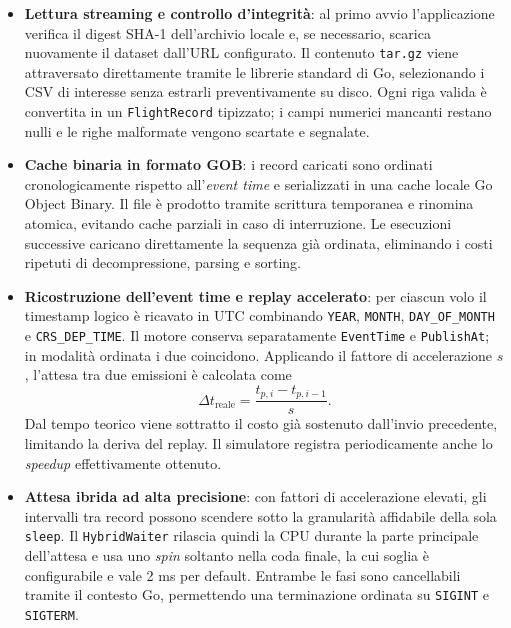 \documentclass[conference]{IEEEtran}
\begin{document}
\begin{itemize}
    \item \textbf{Lettura streaming e controllo d'integrità}: al primo avvio l'applicazione verifica il digest SHA-1 dell'archivio locale e, se necessario, scarica nuovamente il dataset dall'URL configurato. Il contenuto \texttt{tar.gz} viene attraversato direttamente tramite le librerie standard di Go, selezionando i CSV di interesse senza estrarli preventivamente su disco. Ogni riga valida è convertita in un \texttt{FlightRecord} tipizzato; i campi numerici mancanti restano nulli e le righe malformate vengono scartate e segnalate.

    \item \textbf{Cache binaria in formato GOB}: i record caricati sono ordinati cronologicamente rispetto all'\emph{event time} e serializzati in una cache locale Go Object Binary. Il file è prodotto tramite scrittura temporanea e rinomina atomica, evitando cache parziali in caso di interruzione. Le esecuzioni successive caricano direttamente la sequenza già ordinata, eliminando i costi ripetuti di decompressione, parsing e sorting.

    \item \textbf{Ricostruzione dell'event time e replay accelerato}: per ciascun volo il timestamp logico è ricavato in UTC combinando \texttt{YEAR}, \texttt{MONTH}, \texttt{DAY\_OF\_MONTH} e \texttt{CRS\_DEP\_TIME}. Il motore conserva separatamente \texttt{EventTime} e \texttt{PublishAt}; in modalità ordinata i due coincidono. Applicando il fattore di accelerazione $s$, l'attesa tra due emissioni è calcolata come
    \begin{equation}
        \Delta t_{\mathrm{reale}} =
        \frac{t_{p,i}-t_{p,i-1}}{s}.
    \end{equation}
    Dal tempo teorico viene sottratto il costo già sostenuto dall'invio precedente, limitando la deriva del replay. Il simulatore registra periodicamente anche lo \emph{speedup} effettivamente ottenuto.

    \item \textbf{Attesa ibrida ad alta precisione}: con fattori di accelerazione elevati, gli intervalli tra record possono scendere sotto la granularità affidabile della sola \texttt{sleep}. Il \texttt{HybridWaiter} rilascia quindi la CPU durante la parte principale dell'attesa e usa uno \emph{spin} soltanto nella coda finale, la cui soglia è configurabile e vale 2 ms per default. Entrambe le fasi sono cancellabili tramite il contesto Go, permettendo una terminazione ordinata su \texttt{SIGINT} e \texttt{SIGTERM}.


\end{itemize}
\end{document}
